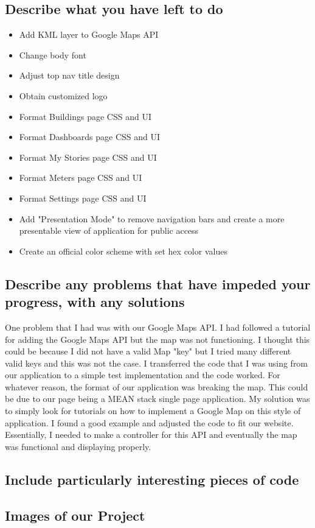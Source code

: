 \documentclass[letterpaper,10pt,serif,draftclsnofoot,onecolumn,compsoc,titlepage]{IEEEtran}
\begin{document}
\subsection{Describe what you have left to do}
\begin{itemize}
Some things that I still need to accomplish:
  \item Add KML layer to Google Maps API
  \item Change body font
  \item Adjust top nav title design
  \item Obtain customized logo
  \item Format Buildings page CSS and UI
  \item Format Dashboards page CSS and UI
  \item Format My Stories page CSS and UI
  \item Format Meters page CSS and UI
  \item Format Settings page CSS and UI
  \item Add "Presentation Mode" to remove navigation bars and create a more presentable view of application for public access
  \item Create an official color scheme with set hex color values

  
\end{itemize}
\subsection{Describe any problems that have impeded your progress, with any solutions}
One problem that I had was with our Google Maps API. I had followed a tutorial for adding the Google Maps API but the map was not functioning. I thought this could 
be because I did not have a valid Map "key" but I tried many different valid keys and this was not the case. I transferred the code that I was using from our application
to a simple test implementation and the code worked. For whatever reason, the format of our application was breaking the map. This could be due to our page being a 
MEAN stack single page application. My solution was to simply look for tutorials on how to implement a Google Map on this style of application. I found a good example and 
adjusted the code to fit our website. Essentially, I needed to make a controller for this API and eventually the map was functional and displaying properly.

\subsection{Include particularly interesting pieces of code}
\subsection{Images of our Project} 


\newpage


\end{document}

